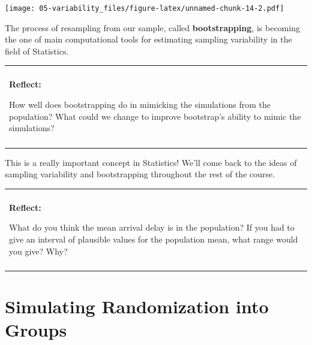 \documentclass[
]{book}
\newenvironment{Shaded}{\begin{snugshade}}{\end{snugshade}}
\newcommand{\CharTok}[1]{\textcolor[rgb]{0.31,0.60,0.02}{#1}}
\newcommand{\CommentTok}[1]{\textcolor[rgb]{0.56,0.35,0.01}{\textit{#1}}}
\newcommand{\DataTypeTok}[1]{\textcolor[rgb]{0.13,0.29,0.53}{#1}}
\newcommand{\DecValTok}[1]{\textcolor[rgb]{0.00,0.00,0.81}{#1}}
\newcommand{\KeywordTok}[1]{\textcolor[rgb]{0.13,0.29,0.53}{\textbf{#1}}}
\newcommand{\NormalTok}[1]{#1}
\newcommand{\OperatorTok}[1]{\textcolor[rgb]{0.81,0.36,0.00}{\textbf{#1}}}
\newcommand{\StringTok}[1]{\textcolor[rgb]{0.31,0.60,0.02}{#1}}
\newenvironment{reflect}
{
    \begin{center}
    
    \begin{tabular}{|p{0.8\textwidth}|}
    \rowcolor{LightBlue}
    \hline\\
    \rowcolor{LightBlue}
    \textbf{Reflect:}
}
{
    \\\rowcolor{LightBlue}
    \\\hline
    \end{tabular} 
    \end{center}
}
\begin{document}
\begin{Shaded}
\end{Shaded}

\texttt{[image: 05-variability\_files/figure-latex/unnamed-chunk-14-2.pdf]}

The process of resampling from our sample, called \textbf{bootstrapping}, is becoming the one of main computational tools for estimating sampling variability in the field of Statistics.

\begin{reflect}
How well does bootstrapping do in mimicking the simulations from the
population? What could we change to improve bootstrap's ability to mimic
the simulations?
\end{reflect}

This is a really important concept in Statistics! We'll come back to the ideas of sampling variability and bootstrapping throughout the rest of the course.

\begin{reflect}
What do you think the mean arrival delay is in the population? If you
had to give an interval of plausible values for the population mean,
what range would you give? Why?
\end{reflect}

\hypertarget{simulating-randomization-into-groups}{%
\section{Simulating Randomization into Groups}\label{simulating-randomization-into-groups}}
\end{document}
